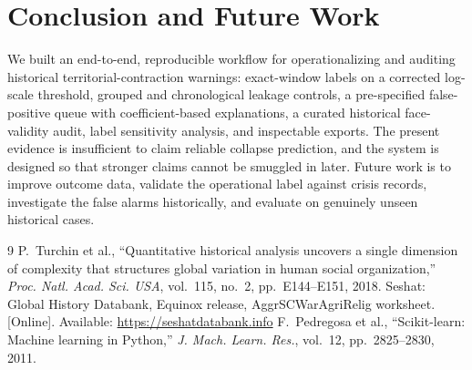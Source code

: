 \documentclass[conference]{IEEEtran}
\begin{document}
\section{Conclusion and Future Work}
We built an end-to-end, reproducible workflow for operationalizing and auditing
historical territorial-contraction warnings: exact-window labels on a corrected
log-scale threshold, grouped and chronological leakage controls, a
pre-specified false-positive queue with coefficient-based explanations, a
curated historical face-validity audit, label sensitivity analysis, and
inspectable exports. The present evidence is insufficient to claim reliable
collapse prediction, and the system is designed so that stronger claims cannot
be smuggled in later. Future work is to improve outcome data, validate the
operational label against crisis records, investigate the false alarms
historically, and evaluate on genuinely unseen historical cases.

\begin{thebibliography}{9}
P.~Turchin et al., ``Quantitative historical analysis uncovers a single
dimension of complexity that structures global variation in human social
organization,'' \emph{Proc. Natl. Acad. Sci. USA}, vol.~115, no.~2,
pp.~E144--E151, 2018.
Seshat: Global History Databank, Equinox release, AggrSCWarAgriRelig
worksheet. [Online]. Available: \url{https://seshatdatabank.info}
F.~Pedregosa et al., ``Scikit-learn: Machine learning in Python,''
\emph{J. Mach. Learn. Res.}, vol.~12, pp.~2825--2830, 2011.
\end{thebibliography}
\end{document}
